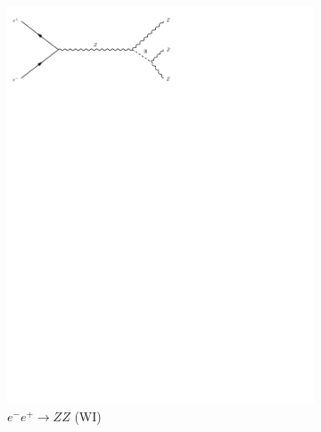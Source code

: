\begin{figure}[h]
\begin{subfigure}[b]{0.3\textwidth}
    \includegraphics[trim={0.5cm 22cm 10cm 0cm},width=\textwidth]{../Diagrams/D11.pdf}
    \caption{$e^-e^+\rightarrow ZZ$ (WI)}
    \label{fey:11}
  \end{subfigure}%
  ~
  \begin{subfigure}[b]{0.3\textwidth}

\end{subfigure}
\end{figure}
